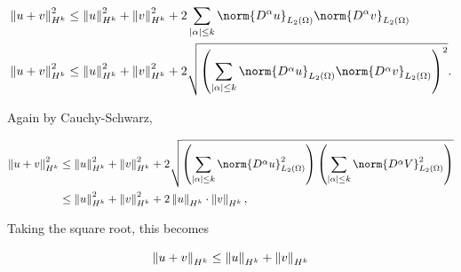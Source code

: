 \documentclass{hw-template}
\begin{document}
\begin{align}
    \hn{u+v}^2 &\leq \hn{u}^2 + \hn{v}^2 + 2 \sum_{|\alpha|\leq k}\norm{D^{\alpha}u}_{L_2(\Omega)} \norm{D^{\alpha}v}_{L_2(\Omega)}\\
    \hn{u+v}^2 &\leq \hn{u}^2 + \hn{v}^2 + 2 \sqrt{\left(\sum_{|\alpha|\leq k}\norm{D^{\alpha}u}_{L_2(\Omega)} \norm{D^{\alpha}v}_{L_2(\Omega)}\right)^2}.
\end{align}

Again by Cauchy-Schwarz,

\begin{align}
    \hn{u+v}^2 &\leq \hn{u}^2 + \hn{v}^2 + 2 \sqrt{\left(\sum_{|\alpha|\leq k} \norm{D^{\alpha}u}_{L_2(\Omega)}^2\right) \left(\sum_{|\alpha|\leq k} \norm{D^{\alpha}V}_{L_2(\Omega)}^2\right)}\\
    &\leq \hn{u}^2 + \hn{v}^2 + 2 \hn{u} \cdot \hn{v},
\end{align}

Taking the square root, this becomes 

\begin{equation}
    \left\| {u+v} \right\|_{H^k} \leq \left\| {u} \right\|_{H^k} + \left\| {v} \right\|_{H^k}
\end{equation}
\end{document}
